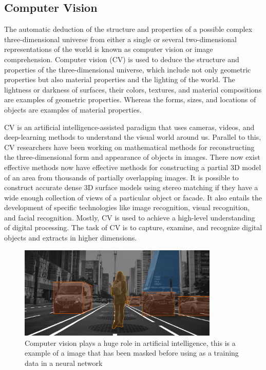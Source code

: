 \subsection{Computer Vision}
The automatic deduction of the structure and properties of a possible complex three-dimensional universe from either a single or several two-dimensional representations of the world is known as computer vision or image comprehension\cite{nalwa_what_1994}. 
Computer vision (CV) is used to deduce the structure and properties of the three-dimensional universe, which include not only geometric properties but also material properties and the lighting of the world. 
The lightness or darkness of surfaces, their colors, textures, and material compositions are examples of geometric properties. Whereas the forms, sizes, and locations of objects are examples of material properties\cite{szeliski_computer_2010}. %

CV is an artificial intelligence-assisted paradigm that uses cameras, videos, and deep-learning methods to understand the visual world around us. Parallel to this, CV researchers have been working on mathematical methods for reconstructing the three-dimensional form and appearance of objects in images\cite{guo_lossy_2018}. 
There now exist effective methods now have effective methods for constructing a partial 3D model of an area from thousands of partially overlapping images. It is possible to construct accurate dense 3D surface models using stereo matching if they have a wide enough collection of views of a particular object or facade\cite{liu_detection_2020}. 
It also entails the development of specific technologies like image recognition, visual recognition, and facial recognition. Mostly, CV is used to achieve a high-level understanding of digital processing. The task of CV is to capture, examine, and recognize digital objects and extracts in higher dimensions\cite{manogaran_wearable_2019}.

\begin{figure}[ht]
  \centering
  \includegraphics[width=0.85\textwidth]{graphics/mask.png}
  \caption{Computer vision plays a huge role in artificial intelligence, this is a example of a image that has been masked before using as a training data in a neural network \cite{ambalina_5_2020}}
  \label{fig:mask}
\end{figure}

